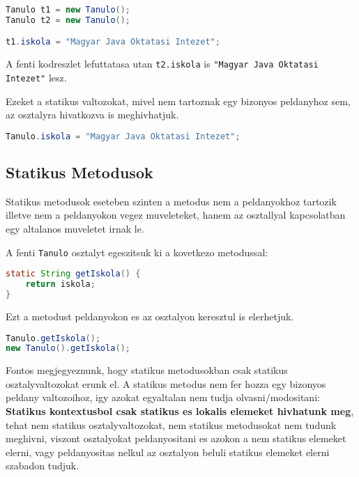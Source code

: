\documentclass{article}
\let\l\lstinline
\begin{document}
\begin{lstlisting}[language=Java, caption=Statikus valtozo modositasa peldanyon keresztul]
Tanulo t1 = new Tanulo();
Tanulo t2 = new Tanulo();

t1.iskola = "Magyar Java Oktatasi Intezet";
\end{lstlisting}

A fenti kodreszlet lefuttatasa utan \l{t2.iskola} is \l{"Magyar Java Oktatasi Intezet"} lesz.

Ezeket a statikus valtozokat, mivel nem tartoznak egy bizonyos peldanyhoz sem, az osztalyra hivatkozva is meghivhatjuk.

\begin{lstlisting}[language=Java, caption=Statikus valtozo modositasa osztalyon keresztul]
Tanulo.iskola = "Magyar Java Oktatasi Intezet";
\end{lstlisting}

\newpage

\subsection{Statikus Metodusok}

Statikus metodusok eseteben szinten a metodus nem a peldanyokhoz tartozik illetve nem a peldanyokon vegez
muveleteket, hanem az osztallyal kapcsolatban egy altalanos muveletet irnak le.

A fenti \l{Tanulo} osztalyt egeszitsuk ki a kovetkezo metodussal:

\begin{lstlisting}[language=Java, caption=Pelda statikus metodus]
static String getIskola() {
    return iskola;
}
\end{lstlisting}

Ezt a metodust peldanyokon es az osztalyon keresztul is elerhetjuk.

\begin{lstlisting}[language=Java, caption=Pelda statikus metodus]
Tanulo.getIskola();
new Tanulo().getIskola();
\end{lstlisting}

Fontos megjegyeznunk, hogy statikus metodusokban csak statikus osztalyvaltozokat erunk el. A statikus metodus nem fer
hozza egy bizonyos peldany valtozoihoz, igy azokat egyaltalan nem tudja olvasni/modositani: \textbf{Statikus kontextusbol
csak statikus es lokalis elemeket hivhatunk meg}, tehat nem statikus osztalyvaltozokat, nem statikus metodusokat nem
tudunk meghivni, viszont osztalyokat peldanyositani es azokon a nem statikus elemeket elerni, vagy peldanyositas
nelkul az osztalyon beluli statikus elemeket elerni szabadon tudjuk.
\end{document}
